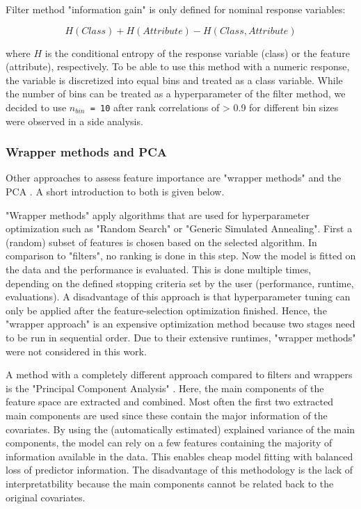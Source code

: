 \documentclass[letterpaper, journal]{IEEEtran}
\begin{document}
\noindent Filter method "information gain" is only defined for nominal response variables:

\begin{equation}
	H(Class) + H(Attribute) - H(Class, Attribute)
\end{equation}

where $H$ is the conditional entropy of the response variable (class) or the feature (attribute), respectively.
To be able to use this method with a numeric response, the variable is discretized into equal bins and treated as a class variable.
While the number of bins can be treated as a hyperparameter of the filter method, we decided to use \texttt{$n_{bin}$ = 10} after rank correlations of > 0.9 for different bin sizes were observed in a side analysis.

\subsubsection{Wrapper methods and PCA}

\noindent Other approaches to assess feature importance are "wrapper methods" and the \ac{PCA} \cite{das2001, jolliffe2016}.
A short introduction to both is given below.

\noindent "Wrapper methods" \cite{chandrashekar2014, kohavi1997} apply algorithms that are used for hyperparameter optimization such as "Random Search" or "Generic Simulated Annealing".
First a (random) subset of features is chosen based on the selected algorithm.
In comparison to "filters", no ranking is done in this step.
Now the model is fitted on the data and the performance is evaluated.
This is done multiple times, depending on the defined stopping criteria set by the user (performance, runtime, evaluations).
A disadvantage of this approach is that hyperparameter tuning can only be applied after the feature-selection optimization finished.
Hence, the "wrapper approach" is an expensive optimization method because two stages need to be run in sequential order.
Due to their extensive runtimes, "wrapper methods" were not considered in this work.

A method with a completely different approach compared to filters and wrappers is the "Principal Component Analysis" \cite{pearson1901, jolliffe2016}.
Here, the main components of the feature space are extracted and combined.
Most often the first two extracted main components are used since these contain the major information of the covariates.
By using the (automatically estimated) explained variance of the main components, the model can rely on a few features containing the majority of information available in the data.
This enables cheap model fitting with balanced loss of predictor information.
The disadvantage of this methodology is the lack of interpretatbility because the main components cannot be related back to the original covariates.
\end{document}
